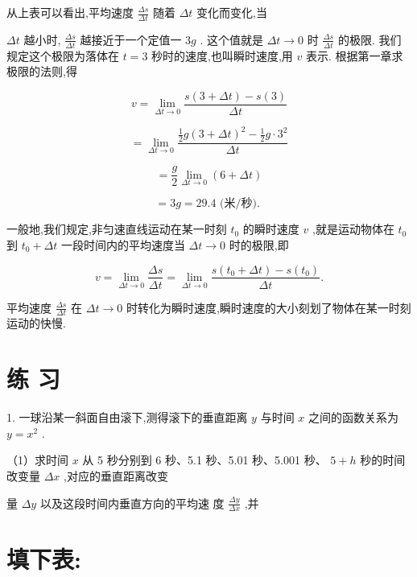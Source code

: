\documentclass[10pt]{article}
\begin{document}
从上表可以看出,平均速度 \(\frac{\Delta s}{\Delta t}\) 随着 \({\Delta t}\) 变化而变化,当

\({\Delta t}\) 越小时, \(\frac{\Delta s}{\Delta t}\) 越接近于一个定值一 \({3g}\) . 这个值就是 \({\Delta t} \rightarrow 0\) 时 \(\frac{\Delta s}{\Delta t}\) 的极限. 我们规定这个极限为落体在 \(t = 3\) 秒时的速度,也叫瞬时速度,用 \(v\) 表示. 根据第一章求极限的法则,得

\[
v = \mathop{\lim }\limits_{{{\Delta t} \rightarrow 0}}\frac{s\left( {3 + {\Delta t}}\right) - s\left( 3\right) }{\Delta t}
\]

\[
= \mathop{\lim }\limits_{{{\Delta t} \rightarrow 0}}\frac{\frac{1}{2}g{\left( 3 + \Delta t\right) }^{2} - \frac{1}{2}g \cdot {3}^{2}}{\Delta t}
\]

\[
= \frac{g}{2}\mathop{\lim }\limits_{{{\Delta t} \rightarrow 0}}\left( {6 + {\Delta t}}\right)
\]

\[
= {3g} = {29.4}\text{ (米/秒). }
\]

一般地,我们规定,非匀速直线运动在某一时刻 \({t}_{0}\) 的瞬时速度 \(v\) ,就是运动物体在 \({t}_{0}\) 到 \({t}_{0} + {\Delta t}\) 一段时间内的平均速度当 \({\Delta t} \rightarrow 0\) 时的极限,即

\[
v = \mathop{\lim }\limits_{{{\Delta t} \rightarrow 0}}\frac{\Delta s}{\Delta t} = \mathop{\lim }\limits_{{{\Delta t} \rightarrow 0}}\frac{s\left( {{t}_{0} + {\Delta t}}\right) - s\left( {t}_{0}\right) }{\Delta t}.
\]

平均速度 \(\frac{\Delta s}{\Delta t}\) 在 \({\Delta t} \rightarrow 0\) 时转化为瞬时速度,瞬时速度的大小刻划了物体在某一时刻运动的快慢.

\section*{练 习}

1. 一球沿某一斜面自由滚下,测得滚下的垂直距离 \(y\) 与时间 \(x\) 之间的函数关系为 \(y = {x}^{2}\) .

（1）求时间 \(x\) 从 5 秒分别到 6 秒、5.1 秒、5.01 秒、5.001 秒、 \(5 + h\) 秒的时间改变量 \({\Delta x}\) ,对应的垂直距离改变

量 \({\Delta y}\) 以及这段时间内垂直方向的平均速 度 \(\frac{\Delta y}{\Delta x}\) ,并

\section*{填下表:}
\end{document}
